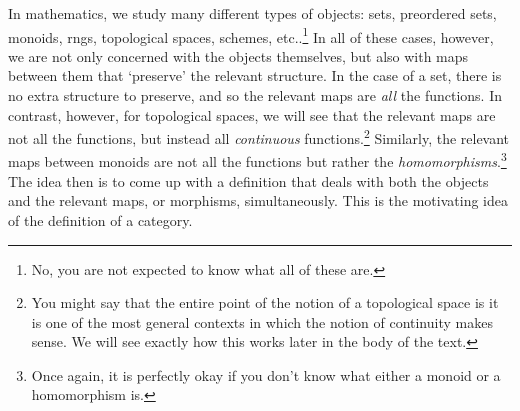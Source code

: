 In mathematics, we study many different types of objects:  sets, preordered sets, monoids, rngs, topological spaces, schemes, etc..\footnote{No, you are not expected to know what all of these are.}  In all of these cases, however, we are not only concerned with the objects themselves, but also with maps between them that `preserve' the relevant structure.  In the case of a set, there is no extra structure to preserve, and so the relevant maps are \emph{all} the functions.  In contrast, however, for topological spaces, we will see that the relevant maps are not all the functions, but instead all \emph{continuous} functions.\footnote{You might say that the entire point of the notion of a topological space is it is one of the most general contexts in which the notion of continuity makes sense.  We will see exactly how this works later in the body of the text.}  Similarly, the relevant maps between monoids are not all the functions but rather the \emph{homomorphisms}.\footnote{Once again, it is perfectly okay if you don't know what either a monoid or a homomorphism is.}  The idea then is to come up with a definition that deals with both the objects and the relevant maps, or morphisms, simultaneously.  This is the motivating idea of the definition of a category.

